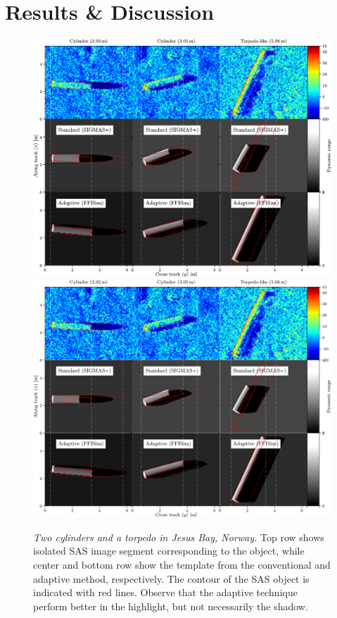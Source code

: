 \section{Results \& Discussion}

\begin{figure}[t]\centering%
\ifOverLeaf%
  \includegraphics[width=.8\linewidth]{gfx/fig_images_sonar_simulator_tagged.pdf}%
\else%
  \includegraphics[width=.8\linewidth]{gfx/fig_images_sonar_simulator_tagged.svg}%
\fi
\caption{\emph{Two cylinders and a torpedo in Jesus Bay, Norway.} Top row shows isolated SAS image segment corresponding to the object, while center and bottom row show the template from the conventional and adaptive method, respectively. The contour of the SAS object is indicated with red lines. Observe that the adaptive technique perform better in the highlight, but not necessarily the shadow.}\label{IV_fig_images_sonar_simulation}%
\end{figure}

